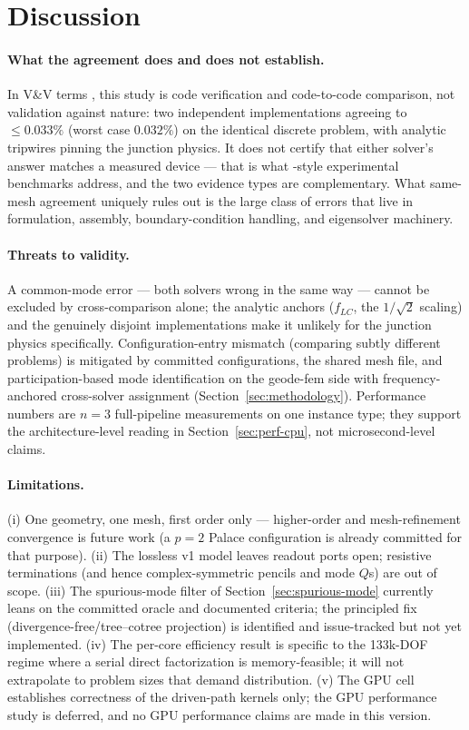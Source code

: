 \documentclass{anvil-paper}
\begin{document}
\section{Discussion}
\label{sec:discussion}

\paragraph{What the agreement does and does not establish.}
In V\&V terms \citep{roache1997quantification,oberkampf2010verification},
this study is code verification and code-to-code comparison, not
validation against nature: two independent implementations agreeing to
$\leq 0.033\%$ (worst case $0.032\%$) on the identical discrete problem,
with analytic tripwires pinning the junction physics. It does not certify
that either solver's answer matches a measured device --- that is what
\citet{ye2025electromagnetic}-style experimental benchmarks address, and
the two evidence types are complementary. What same-mesh agreement
uniquely rules out is the large class of errors that live in formulation,
assembly, boundary-condition handling, and eigensolver machinery.

\paragraph{Threats to validity.}
A common-mode error --- both solvers wrong in the same way --- cannot be
excluded by cross-comparison alone; the analytic anchors ($f_{LC}$, the
$1/\sqrt{2}$ scaling) and the genuinely disjoint implementations make it
unlikely for the junction physics specifically. Configuration-entry
mismatch (comparing subtly different problems) is mitigated by committed
configurations, the shared mesh file, and participation-based mode
identification on the geode-fem side with frequency-anchored cross-solver
assignment (Section~\ref{sec:methodology}). Performance numbers are $n = 3$
full-pipeline measurements on one instance type; they support the
architecture-level reading in Section~\ref{sec:perf-cpu}, not
microsecond-level claims.

\paragraph{Limitations.}
(i) One geometry, one mesh, first order only --- higher-order and
mesh-refinement convergence is future work (a $p = 2$ Palace
configuration is already committed for that purpose). (ii) The lossless v1
model leaves readout ports open; resistive terminations (and hence
complex-symmetric pencils and mode $Q$s) are out of scope. (iii) The
spurious-mode filter of Section~\ref{sec:spurious-mode} currently leans on
the committed oracle and documented criteria; the principled fix
(divergence-free/tree--cotree projection) is identified and issue-tracked
but not yet implemented. (iv) The per-core efficiency result is specific
to the 133k-DOF regime where a serial direct factorization is
memory-feasible; it will not extrapolate to problem sizes that demand
distribution. (v) The GPU cell establishes correctness of the driven-path
kernels only; the GPU performance study is deferred, and no GPU
performance claims are made in this version.
\end{document}
